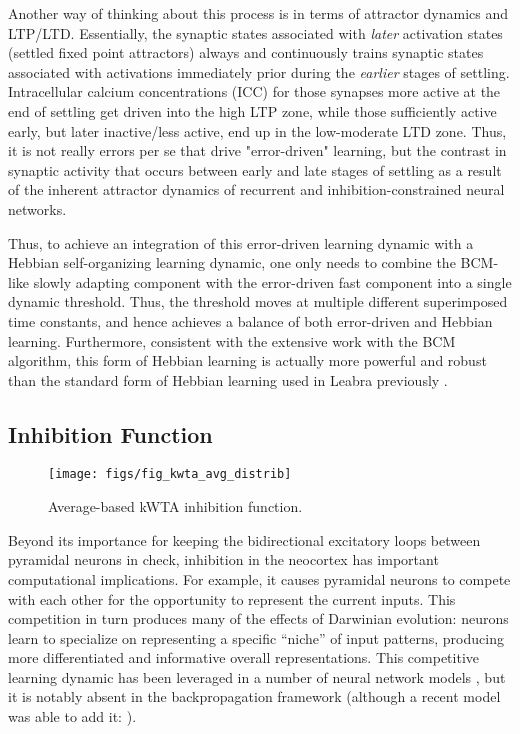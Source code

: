 \documentclass[11pt,twoside]{article}
\begin{document}
Another way of thinking about this process is in terms of attractor
dynamics and LTP/LTD. Essentially, the synaptic states associated with
{\em later} activation states (settled fixed point attractors) always
and continuously trains synaptic states associated with activations
immediately prior during the {\em earlier} stages of settling.
Intracellular calcium concentrations (ICC) for those synapses more
active at the end of settling get driven into the high LTP zone, while
those sufficiently active early, but later inactive/less active, end
up in the low-moderate LTD zone.  Thus, it is not really errors per se
that drive "error-driven" learning, but the contrast in synaptic
activity that occurs between early and late stages of settling as a
result of the inherent attractor dynamics of recurrent and
inhibition-constrained neural networks.
 
Thus, to achieve an integration of this error-driven learning dynamic
with a Hebbian self-organizing learning dynamic, one only needs to
combine the BCM-like slowly adapting component with the error-driven
fast component into a single dynamic threshold.  Thus, the threshold
moves at multiple different superimposed time constants, and hence
achieves a balance of both error-driven and Hebbian learning.
Furthermore, consistent with the extensive work with the BCM
algorithm, this form of Hebbian learning is actually more powerful and
robust than the standard form of Hebbian learning used in Leabra
previously \cite{bcm cites}.

\subsection{Inhibition Function}

\begin{figure}
  \centering\texttt{[image: figs/fig\_kwta\_avg\_distrib]}
  \caption{\small Average-based kWTA inhibition function.}
  \label{fig.kwta_avg}
\end{figure}

Beyond its importance for keeping the bidirectional excitatory loops
between pyramidal neurons in check, inhibition in the neocortex has
important computational implications.  For example, it causes
pyramidal neurons to compete with each other for the opportunity to
represent the current inputs.  This competition in turn produces many
of the effects of Darwinian evolution: neurons learn to specialize on
representing a specific ``niche'' of input patterns, producing more
differentiated and informative overall representations.  This
competitive learning dynamic has been leveraged in a number of neural
network models \cite{RumelhartZipser,Nowlan,Kohonen}, but it is
notably absent in the backpropagation framework (although a recent
model was able to add it: \cite{SaraLaslo}).
\end{document}

